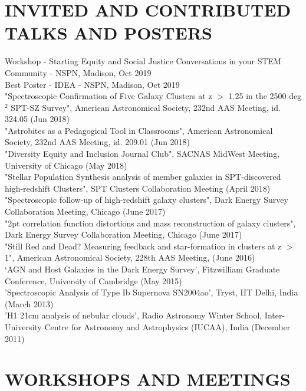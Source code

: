 \documentclass[margin]{res}
\begin{document}
\begin{resume}
\section{INVITED AND CONTRIBUTED TALKS AND POSTERS}
Workshop - Starting Equity and Social Justice Conversations in your STEM Community - NSPN, Madison, Oct 2019\\
Best Poster - IDEA - NSPN, Madison, Oct 2019\\
"Spectroscopic Confirmation of Five Galaxy Clusters at z $>$ 1.25 in the 2500 deg$^2$ SPT-SZ Survey", American Astronomical Society, 232nd AAS Meeting, id. 324.05 (Jun 2018)\\
"Astrobites as a Pedagogical Tool in Classrooms", American Astronomical Society, 232nd AAS Meeting, id. 209.01 (Jun 2018)\\
"Diversity Equity and Inclusion Journal Club", SACNAS MidWest Meeting, University of Chicago (May 2018)\\
"Stellar Population Synthesis analysis of member galaxies in SPT-discovered high-redshift Clusters", SPT Clusters Collaboration Meeting (April 2018)\\
"Spectroscopic follow-up of high-redshift galaxy clusters", Dark Energy Survey Collaboration Meeting, Chicago (June 2017)\\
"2pt correlation function distortions and mass reconstruction of galaxy clusters", Dark Energy Survey Collaboration Meeting, Chicago (June 2017)\\
"Still Red and Dead? Measuring feedback and star-formation in clusters at z $>$ 1", American Astronomical Society, 228th AAS Meeting, (June 2016)\\
`AGN and Host Galaxies in the Dark Energy Survey', Fitzwilliam Graduate Conference, University of Cambridge (May 2015)\\
'Spectroscopic Analysis of Type Ib Supernova SN2004ao', Tryst, IIT Delhi, India (March 2013)\\ 
'H1 21cm analysis of nebular clouds', Radio Astronomy Winter School, Inter-University Centre for Astronomy and Astrophysics (IUCAA), India (December 2011)\\

\section{WORKSHOPS AND MEETINGS}


\end{resume}
\end{document}
